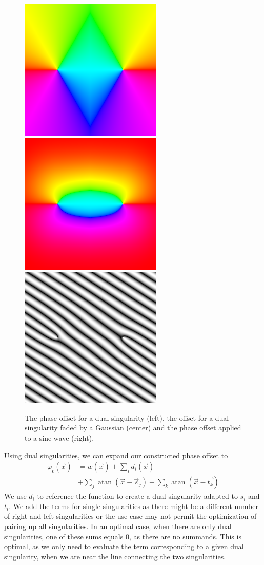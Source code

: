 \documentclass{utue} %
\DeclareMathOperator{\atan}{atan}
\begin{document}
\begin{figure}[ht]
  \centering
  \includegraphics[width=0.32\linewidth]{images/dualSingularityPhase}
  \hfill
  \includegraphics[width=0.32\linewidth]{images/dualSingularityFaded}
  \hfill
  \includegraphics[width=0.32\linewidth]{images/dualSingularitySineWave}
  \caption{The phase offset for a dual singularity (left), the offset for a dual singularity faded by a Gaussian (center) and the phase offset applied to a sine wave (right).}\label{fig:dualSingularity}
\end{figure}

Using dual singularities, we can expand our constructed phase offset to
\begin{align*}
  \varphi_c(\vec{x})&=w(\vec{x}) +\sum_i d_i(\vec{x})\\
  & + \sum_j \atan(\vec{x}-\vec{s}_j) - \sum_k \atan(\vec{x}-\vec{t_k})
\end{align*}
We use $d_i$ to reference the function to create a dual singularity adapted to $s_i$ and $t_i$. We add the terms for single singularities as there might be a different number of right and left singularities or the use case may not permit the optimization of pairing up all singularities. In an optimal case, when there are only dual singularities, one of these sums equals $0$, as there are no summands. This is optimal, as we only need to evaluate the term corresponding to a given dual singularity, when we are near the line connecting the two singularities.
\end{document}
